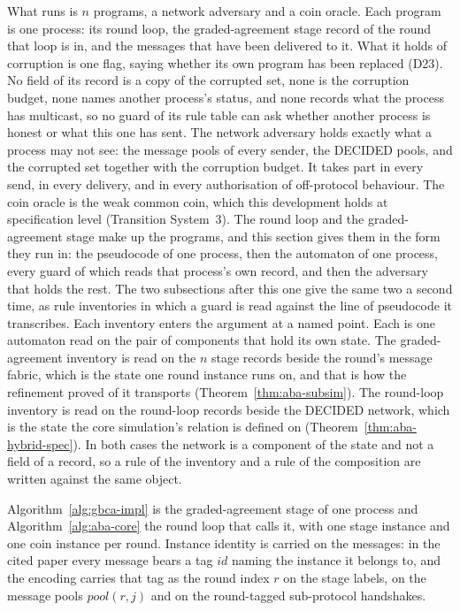 What runs is $n$ programs, a network adversary and a coin oracle.
Each program is one process: its round loop, the graded-agreement stage record
of the round that loop is in, and the messages that have been delivered to it.
What it holds of corruption is one flag, saying whether its own program has been
replaced (D23).
No field of its record is a copy of the corrupted set, none is the corruption
budget, none names another process's status, and none records what the process
has multicast, so no guard of its rule table can ask whether another process is
honest or what this one has sent.
The network adversary holds exactly what a process may not see: the message
pools of every sender, the DECIDED pools, and the corrupted set together with
the corruption budget.
It takes part in every send, in every delivery, and in every authorisation of
off-protocol behaviour.
The coin oracle is the weak common coin, which this development holds at
specification level (Transition System~3).
The round loop and the graded-agreement stage make up the programs, and this
section gives them in the form they run in: the pseudocode of one process, then
the automaton of one process, every guard of which reads that process's own
record, and then the adversary that holds the rest.
The two subsections after this one give the same two a second time, as rule
inventories in which a guard is read against the line of pseudocode it
transcribes.
Each inventory enters the argument at a named point.
Each is one automaton read on the pair of components that hold its own state.
The graded-agreement inventory is read on the $n$ stage records beside the
round's message fabric, which is the state one round instance runs on, and
that is how the refinement proved of it transports
(Theorem~\ref{thm:aba-subsim}).
The round-loop inventory is read on the round-loop records beside the DECIDED
network, which is the state the core simulation's relation is defined on
(Theorem~\ref{thm:aba-hybrid-spec}).
In both cases the network is a component of the state and not a field of a record,
so a rule of the inventory and a rule of the composition are written against the
same object.

Algorithm~\ref{alg:gbca-impl} is the graded-agreement stage of one process and
Algorithm~\ref{alg:aba-core} the round loop that calls it, with one stage
instance and one coin instance per round.
Instance identity is carried on the messages: in the cited paper every message
bears a tag $id$ naming the instance it belongs to, and the encoding carries
that tag as the round index $r$ on the stage labels, on the message pools
$pool(r,j)$ and on the round-tagged sub-protocol handshakes.


